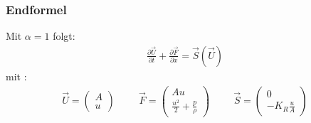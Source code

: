 \begin{frame}
\frametitle{\textbf{Endformel}}
Mit $\alpha=1$ folgt:
\begin{align}
\boxed{\frac{\partial \vec{U}}{\partial t}+\frac{\partial \vec{F}}{\partial x}=\vec{S}(\vec{U})}
\end{align}
mit :
\begin{align*}
\vec{U}=\begin{pmatrix} A \\ u \end{pmatrix} \hspace{1cm} \vec{F}=\begin{pmatrix} Au \\ \frac{u^2}{2} + \frac{p}{\rho}
\end{pmatrix} \hspace{1cm} \vec{S}=\begin{pmatrix} 0 \\ -K_R \frac{u}{A}
\end{pmatrix}
\end{align*}
\end{frame}
